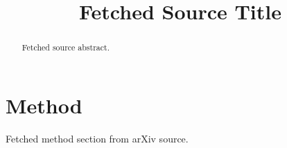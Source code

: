 \title{Fetched Source Title}

\begin{abstract}Fetched source abstract.\end{abstract}
\section{Method}
Fetched method section from arXiv source.

